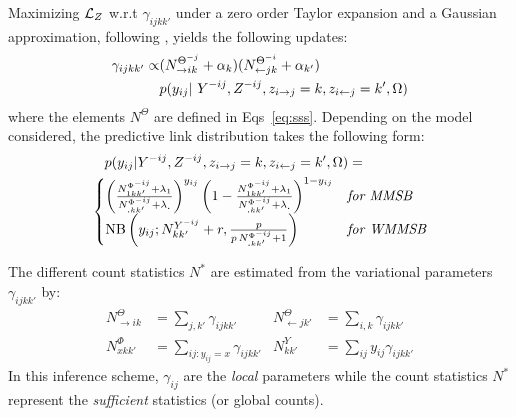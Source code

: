 Maximizing $\mathcal{L}_Z$ w.r.t $\gamma_{ijkk'}$ under a zero order Taylor expansion and a Gaussian approximation, following \cite{teh2007collapsed,asuncion2009smoothing}, yields the following updates:
%
\begin{align} \label{eq:maximization}
\gamma_{ijkk'} \propto &(N_{\rightarrow ik}^{\Theta^{-j}} + \alpha_k) (N_{\leftarrow jk}^{\Theta^{-i}} + \alpha_{k'}) \nonumber\\
  &p(y_{ij} | Y^{-ij}, Z^{- ij}, \zij=k, \zji=k',\Omega)
\end{align}
%
where the elements $N^{\Theta}$ are defined in Eqs~\eqref{eq:sss}. Depending on the model considered, the predictive link distribution
takes the following form:
%
\begin{align*}
&\quad p(y_{ij} | Y^{-ij}, Z^{- ij}, \zij=k, \zji=k',\Omega) = \\
&\begin{cases}
    \left( \frac{ N^{\Phi^{-ij}}_{1 kk'} + \lambda_1}{N^{\Phi^{-ij}}_{\bm{.}kk'} + \lambda_{\bm{.}}}\right)^{y_{ij}} \left( 1- \frac{ N^{\Phi^{-ij}}_{1 kk'} + \lambda_1}{N^{\Phi^{-ij}}_{\bm{.}kk'} + \lambda_{\bm{.}}}\right)^{1-y_{ij}}  & \textrm{\textit{for MMSB}} \\
    \mathrm{NB}\left(y_{ij}; N^{Y^{-ij}}_{kk'} + r, \frac{p}{p\,N^{\Phi^{-ij}}_{\bm{.}kk'} + 1} \right) & \textrm{\textit{for WMMSB}} %
\end{cases}
\end{align*}

The different count statistics $N^*$ are estimated from the variational parameters $\gamma_{ijkk'}$ by:
%
\begin{align} \label{eq:sss}
    N^{\Theta}_{\rightarrow ik} &= \sum_{j, k'} \gamma_{ijkk'}        & N^{\Theta}_{\leftarrow jk'} &= \sum_{i, k} \gamma_{ijkk'}  \nonumber \\
    N^{\Phi}_{xkk'} &= \sum_{ij:y_{ij}=x} \gamma_{ijkk'}  & N^{Y}_{kk'} &= \sum_{ij} y_{ij}\gamma_{ijkk'}
\end{align}
%
In this inference scheme, $\gamma_{ij}$ are the \emph{local} parameters while the count statistics $N^*$ represent the \emph{sufficient} statistics (or global counts).

